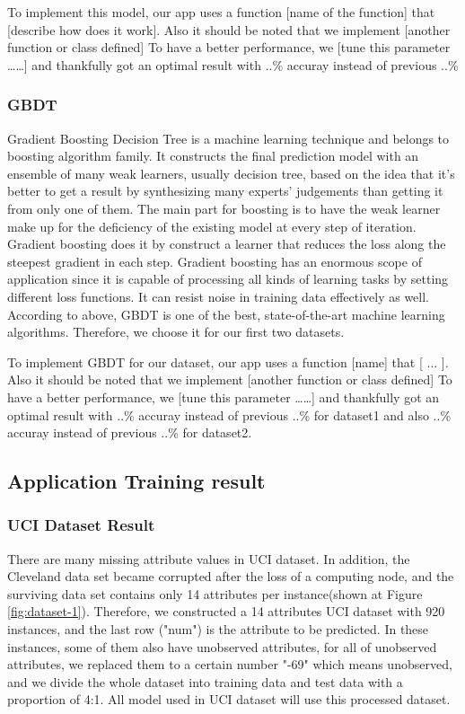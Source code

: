 \documentclass[letterpaper]{article} %
\begin{document}
To implement this model, our app uses a function [name of the function] that [describe how does it work]. Also it should be noted that we implement [another function or class defined]
To have a better performance, we [tune this parameter ……] and thankfully got an optimal result with ..\% accuray instead of previous  ..\%


\subsubsection{GBDT}

Gradient Boosting Decision Tree is a machine learning technique and belongs to boosting algorithm family. It constructs the final prediction model with an ensemble of many weak learners, usually decision tree, based on the idea that it’s better to get a result by synthesizing many experts’ judgements than getting it from only one of them. The main part for boosting is to have the weak learner make up for the deficiency of the existing model at every step of iteration. Gradient boosting does it by construct a learner that reduces the loss along the steepest gradient in each step. Gradient boosting has an enormous scope of application since it is capable of processing all kinds of learning tasks by setting different loss functions. It can resist noise in training data effectively as well. According to above, GBDT is one of the best, state-of-the-art machine learning algorithms. Therefore, we choose it for our first two datasets. 

To implement GBDT for our dataset, our app uses a function [name] that [ ... ]. Also it should be noted that we implement [another function or class defined]
To have a better performance, we [tune this parameter ……] and thankfully got an optimal result with ..\% accuray instead of previous  ..\%  for dataset1 and also ..\% accuray instead of previous  ..\%  for dataset2.

\subsection{Application Training result}

\subsubsection{UCI Dataset Result}

There are many missing attribute values in UCI dataset. In addition, the Cleveland data set became corrupted after the loss of a computing node, and the surviving data set contains only 14 attributes per instance(shown at Figure \ref{fig:dataset-1}). Therefore, we constructed a 14 attributes UCI dataset with 920 instances, and the last row ("num") is the attribute to be predicted. In these instances, some of them also have unobserved attributes, for all of unobserved attributes, we replaced them to a certain number "-69" which means unobserved, and we divide the whole dataset into training data and test data with a proportion of 4:1. All model used in UCI dataset will use this processed dataset.
\end{document}
